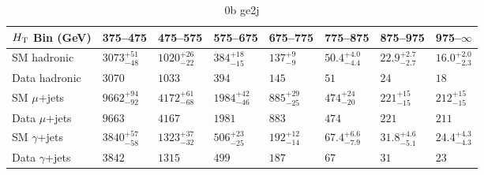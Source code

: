 \documentclass[8pt]{article}
\def\scalht{\mbox{$H_{\rm{T}}$}\xspace}
\newcommand\T{\rule{0pt}{2.6ex}}
\newcommand\B{\rule[-1.2ex]{0pt}{0pt}}
\begin{document}
\begin{table}[ht!]
\caption{0b ge2j}
\label{tab:ensemble-0b ge2j}
\centering
\begin{tabular}{ llllllll }

\hline
\scalht Bin (GeV)       & 375--475                       & 475--575                       & 575--675                       & 675--775                       & 775--875                       & 875--975                       & 975--$\infty$                  \\ [1.000000ex]
\hline
SM hadronic\T           & $3073^{+51}_{-48}$             & $1020^{+26}_{-22}$             & $384^{+18}_{-15}$              & $137^{+9}_{-9}$                & $50.4^{+4.0}_{-4.4}$           & $22.9^{+2.7}_{-2.7}$           & $16.0^{+2.0}_{-2.3}$           \\ 
Data hadronic\B         & $3070$                         & $1033$                         & $394$                          & $145$                          & $51$                           & $24$                           & $18$                           \\ 
\hline
SM $\mu$+jets\T         & $9662^{+94}_{-92}$             & $4172^{+61}_{-68}$             & $1984^{+42}_{-46}$             & $885^{+29}_{-25}$              & $474^{+24}_{-20}$              & $221^{+15}_{-15}$              & $212^{+15}_{-15}$              \\ 
Data $\mu$+jets\B       & $9663$                         & $4167$                         & $1981$                         & $883$                          & $474$                          & $221$                          & $211$                          \\ 
\hline
SM $\gamma$+jets\T      & $3840^{+57}_{-58}$             & $1323^{+37}_{-32}$             & $506^{+23}_{-25}$              & $192^{+12}_{-14}$              & $67.4^{+6.6}_{-7.9}$           & $31.8^{+4.6}_{-5.1}$           & $24.4^{+4.3}_{-4.3}$           \\ 
Data $\gamma$+jets\B    & $3842$                         & $1315$                         & $499$                          & $187$                          & $67$                           & $31$                           & $23$                           \\ 
\hline

\end{tabular}
\end{table}
\end{document}
